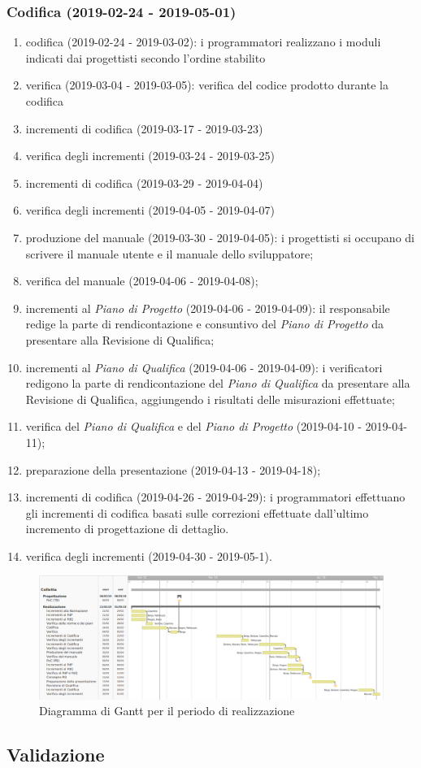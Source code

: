 		\subsubsection{Codifica (2019-02-24 - 2019-05-01)}
			\begin{enumerate}[label= 4.2.\arabic*)]
				\item codifica (2019-02-24 - 2019-03-02): i programmatori realizzano i moduli indicati dai progettisti secondo l'ordine stabilito
				\item verifica (2019-03-04 - 2019-03-05): verifica del codice prodotto durante la codifica
				\item incrementi di codifica (2019-03-17 - 2019-03-23)
				\item verifica degli incrementi (2019-03-24 - 2019-03-25)
				\item incrementi di codifica (2019-03-29 - 2019-04-04)
				\item verifica degli incrementi (2019-04-05 - 2019-04-07)
				\item produzione del manuale (2019-03-30 - 2019-04-05): i progettisti si occupano di scrivere il manuale utente e il manuale dello sviluppatore;
				\item verifica del manuale (2019-04-06 - 2019-04-08);
				\item incrementi al \textit{Piano di Progetto} (2019-04-06 - 2019-04-09): il responsabile redige la parte di rendicontazione e consuntivo del \textit{Piano di Progetto} da presentare alla Revisione di Qualifica;
				\item incrementi al \textit{Piano di Qualifica} (2019-04-06 - 2019-04-09): i verificatori redigono la parte di rendicontazione del \textit{Piano di Qualifica} da presentare alla Revisione di Qualifica, aggiungendo i risultati delle misurazioni effettuate;
				\item verifica del \textit{Piano di Qualifica} e del \textit{Piano di Progetto} (2019-04-10 - 2019-04-11);
				\item preparazione della presentazione (2019-04-13 - 2019-04-18);
				\item incrementi di codifica (2019-04-26 - 2019-04-29): i programmatori effettuano gli incrementi di codifica basati sulle correzioni effettuate dall'ultimo incremento di progettazione di dettaglio.
				\item verifica degli incrementi (2019-04-30 - 2019-05-1).
			\end{enumerate}
		
	\newpage
	\begin{figure}[!hbtp]
		\centering
		\includegraphics[scale=0.5, angle=90]{images/ganttreal.png}
		\caption{Diagramma di Gantt per il periodo di realizzazione}
	\end{figure}
	
	\newpage
	\subsection{Validazione}